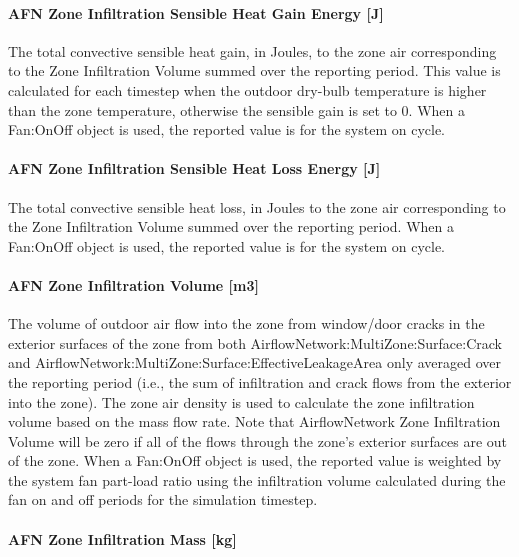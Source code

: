 \paragraph{AFN Zone Infiltration Sensible Heat Gain Energy {[}J{]}}\label{afn-zone-infiltration-sensible-heat-gain-energy-j-1}

The total convective sensible heat gain, in Joules, to the zone air corresponding to the Zone Infiltration Volume summed over the reporting period. This value is calculated for each timestep when the outdoor dry-bulb temperature is higher than the zone temperature, otherwise the sensible gain is set to 0. When a Fan:OnOff object is used, the reported value is for the system on cycle.

\paragraph{AFN Zone Infiltration Sensible Heat Loss Energy {[}J{]}}\label{afn-zone-infiltration-sensible-heat-loss-energy-j-1}

The total convective sensible heat loss, in Joules to the zone air corresponding to the Zone Infiltration Volume summed over the reporting period. When a Fan:OnOff object is used, the reported value is for the system on cycle.

\paragraph{AFN Zone Infiltration Volume {[}m3{]}}\label{afn-zone-infiltration-volume-m3}

The volume of outdoor air flow into the zone from window/door cracks in the exterior surfaces of the zone from both AirflowNetwork:MultiZone:Surface:Crack and AirflowNetwork:MultiZone:Surface:EffectiveLeakageArea only averaged over the reporting period (i.e., the sum of infiltration and crack flows from the exterior into the zone). The zone air density is used to calculate the zone infiltration volume based on the mass flow rate. Note that AirflowNetwork Zone Infiltration Volume will be zero if all of the flows through the zone's exterior surfaces are out of the zone. When a Fan:OnOff object is used, the reported value is weighted by the system fan part-load ratio using the infiltration volume calculated during the fan on and off periods for the simulation timestep.

\paragraph{AFN Zone Infiltration Mass {[}kg{]}}\label{afn-zone-infiltration-mass-kg}

